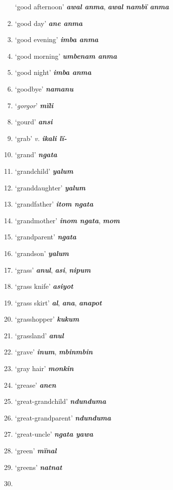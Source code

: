\begin{enumerate}[noitemsep, label={}, align=left, widest=190, labelsep=1ex,leftmargin=*,itemindent=-10pt]
‘good afternoon’ \textbf{\textit{awal anma}}, \textbf{\textit{awal nambï anma}} \item
‘good day’ \textbf{\textit{ane anma}} \item
‘good evening’ \textbf{\textit{imba anma}} \item
‘good morning’ \textbf{\textit{umbenam anma}} \item
‘good night’ \textbf{\textit{imba anma}} \item
‘goodbye’ \textbf{\textit{namanu}} \item
‘\textit{gorgor}’ \textbf{\textit{mïli}} \item
‘gourd’ \textbf{\textit{ansi}} \item
‘grab’ \textit{v.} \textbf{\textit{ikali lï-}} \item
‘grand’ \textbf{\textit{ngata}} \item
‘grandchild’ \textbf{\textit{yalum}} \item
‘granddaughter’ \textbf{\textit{yalum}} \item
‘grandfather’ \textbf{\textit{itom ngata}} \item
‘grandmother’ \textbf{\textit{inom ngata}}, \textbf{\textit{mom}} \item
‘grandparent’ \textbf{\textit{ngata}} \item
‘grandson’ \textbf{\textit{yalum}} \item
‘grass’ \textbf{\textit{anul}}, \textbf{\textit{asi}}, \textbf{\textit{nipum}} \item
‘grass knife’ \textbf{\textit{asiyot}} \item
‘grass skirt’ \textbf{\textit{al}}, \textbf{\textit{ana}}, \textbf{\textit{anapot}} \item
‘grasshopper’ \textbf{\textit{kukum}} \item
‘grassland’ \textbf{\textit{anul}} \item
‘grave’ \textbf{\textit{inum}}, \textbf{\textit{mbinmbin}} \item
‘gray hair’ \textbf{\textit{monkin}} \item
‘grease’ \textbf{\textit{anen}} \item
‘great-grandchild’ \textbf{\textit{ndunduma}} \item
‘great-grandparent’ \textbf{\textit{ndunduma}} \item
‘great-uncle’ \textbf{\textit{ngata yawa}} \item
‘green’ \textbf{\textit{mïnal}} \item
‘greens’ \textbf{\textit{natnat}} \item

\end{enumerate}

